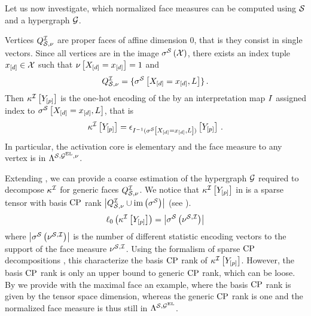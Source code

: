 %
Let us now investigate, which normalized face measures can be computed using $\mathcal{S}$ and a hypergraph $\mathcal{G}$.

\begin{example}[Vertices]
    \label{exa:vertexMeasures}
    Vertices $Q^{\mathcal{I}}_{\mathcal{S},\nu}$ are proper faces of affine dimension $0$, that is they consist in single vectors.
    Since all vertices are in the image $\sigma^{\mathcal{S}}\left(\mathcal{X}\right)$, there exists an index tuple $x_{[d]}\in\mathcal{X}$ such that $\nu\left[X_{[d]}=x_{[d]}\right]=1$ and
    \begin{align*}
        Q^{\mathcal{I}}_{\mathcal{S},\nu} = \{\sigma^{\mathcal{S}}\left[X_{[d]}=x_{[d]},L\right]\} \, .
    \end{align*}
    Then $\kappa^{\mathcal{I}}\left[Y_{[p]}\right]$ is the one-hot encoding of the by an interpretation map $I$ assigned index to $\sigma^{\mathcal{S}}\left[X_{[d]}=x_{[d]},L\right]$, that is
    \begin{align*}
        \kappa^{\mathcal{I}}\left[Y_{[p]}\right] = \epsilon_{I^{-1}(\sigma^{\mathcal{S}}\left[X_{[d]}=x_{[d]},L\right])}\left[Y_{[p]}\right] \, .
    \end{align*}
    In particular, the activation core is elementary and the face measure to any vertex is in $\Lambda^{\mathcal{S},\mathcal{G}^{\mathrm{EL}},\nu}$.
\end{example}


Extending , we can provide a coarse estimation of the hypergraph $\mathcal{G}$ required to decompose $\kappa^{\mathcal{I}}$ for generic faces $Q^{\mathcal{I}}_{\mathcal{S},\nu}$.
We notice that $\kappa^{\mathcal{I}}\left[Y_{[p]}\right]$ in  is a sparse tensor with basis $\mathrm{CP}$ rank $\left|Q^{\mathcal{I}}_{\mathcal{S},\nu}\cup\mathrm{im}\left(\sigma^{\mathcal{S}}\right)\right|$ (see ).
\begin{align*}
    \ell_0\left(\kappa^{\mathcal{I}}\left[Y_{[p]}\right]\right)
    = \left|
        \sigma^{\mathcal{S}}\left(\nu^{\mathcal{S},\mathcal{I}}\right)
    \right|
\end{align*}
where $\left|\sigma^{\mathcal{S}}\left(\nu^{\mathcal{S},\mathcal{I}}\right)\right|$ is the number of different statistic encoding vectors to the support of the face measure $\nu^{\mathcal{S},\mathcal{I}}$.
Using the formalism of sparse $\mathrm{CP}$ decompositions , this characterize the basis $\mathrm{CP}$ rank of $\kappa^{\mathcal{I}}\left[Y_{[p]}\right]$.
However, the basis $\mathrm{CP}$ rank is only an upper bound to generic $\mathrm{CP}$ rank, which can be loose.
By  we provide with the maximal face an example, where the basis $\mathrm{CP}$ rank is given by the tensor space dimension, whereas the generic $\mathrm{CP}$ rank is one and the normalized face measure is thus still in $\Lambda^{\mathcal{S},\mathcal{G}^{\mathrm{EL}}}$.

